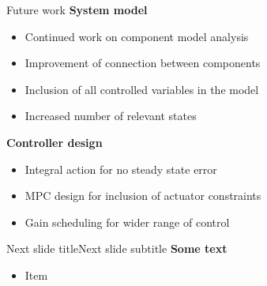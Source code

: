 \begin{frame}{Future work}
	 \textbf{System model}
	 \begin{itemize}
	 	\item Continued work on component model analysis
	 	\item Improvement of connection between components
	 	\item Inclusion of all controlled variables in the model
	 	\item Increased number of relevant states
	 \end{itemize}
 
 \bigskip
 
 	\textbf{Controller design}
	\begin{itemize}
 		\item Integral action for no steady state error
 		\item MPC design for inclusion of actuator constraints
 		\item Gain scheduling for wider range of control
 	\end{itemize}
\end{frame}


\begin{frame}{Next slide title}{Next slide subtitle}
	 \textbf{Some text}
	\begin{itemize}
		\item Item
	\end{itemize}
\end{frame}

